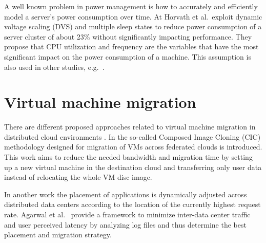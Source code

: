 A well known problem in power management is how to accurately and efficiently model a server's power consumption over time. At \cite{horvath2008multi} Horvath et al.~exploit dynamic voltage scaling (DVS) and multiple sleep states to reduce power consumption of a server cluster of about 23\% without significantly impacting performance. They propose that CPU utilization and frequency are the variables that have the most significant impact on the power consumption of a machine. This assumption is also used in other studies, e.g.~\cite{rao2010minimizing, hammadi2014survey, kliazovich2012greencloud}. 


\section{Virtual machine migration}

There are different proposed approaches related to virtual machine migration in distributed cloud environments \cite{celesti2010improving, malet2010resource}. In \cite{celesti2010improving} the so-called Composed Image Cloning (CIC) methodology designed for migration of VMs across federated clouds is introduced. This work aims to reduce the needed bandwidth and migration time by setting up a new virtual machine in the destination cloud and transferring only user data instead of relocating the whole VM disc image. 

In another work \cite{malet2010resource} the placement of applications is dynamically adjusted across distributed data centers according to the location of the currently highest request rate. Agarwal et al.~\cite{agarwal2010volley} provide a framework to minimize inter-data center traffic and user perceived latency by analyzing log files and thus determine the best placement and migration strategy. 



%
%

